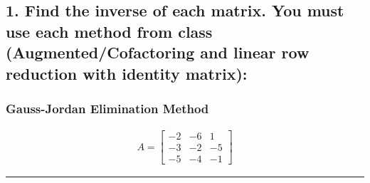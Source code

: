 \documentclass[
  letterpaper,
  DIV=11,
  numbers=noendperiod]{scrartcl}
\author{}
\date{}
\renewcommand*\contentsname{Table of contents}
\newcommand\contentsname{Table of contents}
\begin{document}

\newpage

\ifdefined\Shaded\renewenvironment{Shaded}{\begin{tcolorbox}[sharp corners, borderline west={3pt}{0pt}{shadecolor}, boxrule=0pt, interior hidden, enhanced, breakable, frame hidden]}{\end{tcolorbox}}\fi

\renewcommand*\contentsname{Table of contents}
{
\hypersetup{linkcolor=}
\setcounter{tocdepth}{4}
\tableofcontents
}
\newpage{}

\hypertarget{find-the-inverse-of-each-matrix.-you-must-use-each-method-from-class-augmentedcofactoring-and-linear-row-reduction-with-identity-matrix}{%
\subsection{1. Find the inverse of each matrix. You must use each method
from class (Augmented/Cofactoring and linear row reduction with identity
matrix):}\label{find-the-inverse-of-each-matrix.-you-must-use-each-method-from-class-augmentedcofactoring-and-linear-row-reduction-with-identity-matrix}}

\hypertarget{gauss-jordan-elimination-method}{%
\subsubsection{Gauss-Jordan Elimination
Method}\label{gauss-jordan-elimination-method}}

\begin{align*}
A = \begin{bmatrix}
-2 & -6 & 1 \\
-3 & -2 & -5 \\
-5 & -4 & -1
\end{bmatrix}
\end{align*}

\centering \textcolor[RGB]{0,0,0}{\rule{\linewidth}{0.6pt}}
\end{document}
